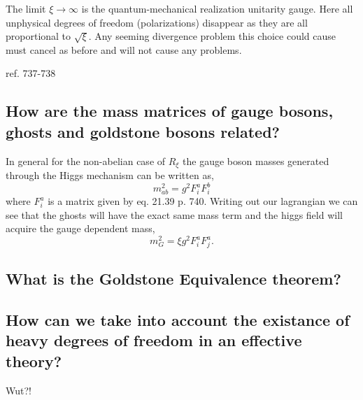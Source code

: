 \documentclass[paper=a4, fontsize=11pt]{scrartcl} %
\numberwithin{equation}{section} %
\numberwithin{figure}{section} %
\numberwithin{table}{section} %
\begin{document}
The limit $\xi \rightarrow \infty$ is the quantum-mechanical realization unitarity gauge. Here all unphysical degrees of freedom (polarizations) disappear as they are all proportional to $\sqrt{\xi}$. Any seeming divergence problem this choice could cause must cancel as before and will not cause any problems.

ref. 737-738

\subsection*{How are the mass matrices of gauge bosons, ghosts and goldstone bosons related?}

In general for the non-abelian case of $R_{\xi}$ the gauge boson masses generated through the Higgs mechanism can be written as,
\begin{equation}
m_{ab}^2 = g^2 F_{i}^a F_{i}^b
\end{equation}
where $F_{i}^a$ is a matrix given by eq. 21.39 p. 740. Writing out our lagrangian we can see that the ghosts will have the exact same mass term and the higgs field will acquire the gauge dependent mass,
\begin{equation}
m_G^2 = \xi g^2 F_i^a F_j^a.
\end{equation}

\subsection*{What is the Goldstone Equivalence theorem?}



\subsection*{How can we take into account the existance of heavy degrees of freedom in an effective theory?}
Wut?!
\end{document}
